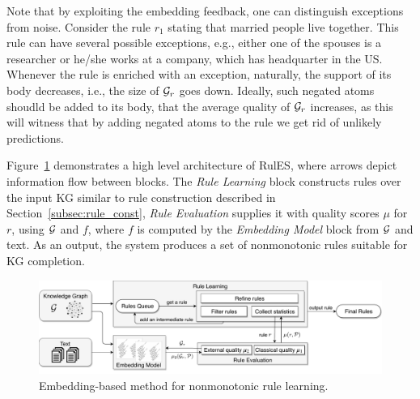 Note that by exploiting the embedding feedback, one can distinguish
exceptions from noise. Consider the rule $r_1$ stating that married people live together. This
rule can have several possible exceptions, e.g., either one of the spouses is a researcher
or he/she works at a company, which has headquarter in the US. Whenever the rule is
enriched with an exception, naturally, the support of its body decreases, i.e., the size of
$\mathcal{G}_r$ goes down. Ideally, such negated atoms shoudld be added to its body, that the average quality of
$\mathcal{G}_r$ increases, as this will witness that by adding negated atoms to the rule we get rid of
unlikely predictions.

Figure~\ref{fig:system} demonstrates a high level architecture of RulES, where arrows depict information flow between blocks.
The \emph{Rule Learning} block constructs rules over the input KG similar to rule construction described in Section~\ref{subsec:rule_const}, \emph{Rule Evaluation} supplies it with quality scores $\mu$ for $r$, using $\mathcal{G}$ and $f$, where $f$ is computed by the \emph{Embedding Model} block from $\mathcal{G}$ and text. As an output, the system produces a set of nonmonotonic rules suitable for KG completion.



   \begin{figure}[t]
\centering
\includegraphics[width=1\textwidth]{figures/rules_overview_H.pdf}
\caption{Embedding-based method for nonmonotonic rule learning.}
\label{fig:system}
\end{figure}

